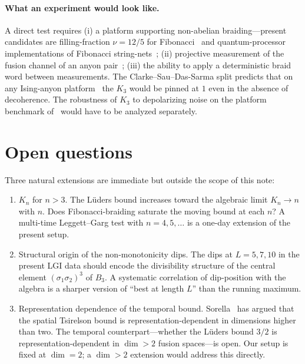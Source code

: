 \documentclass[aps,prx,reprint,amsmath,amssymb,floatfix,nofootinbib,superscriptaddress]{revtex4-2}
\begin{document}
\paragraph{What an experiment would look like.}
A direct test requires (i) a platform supporting non-abelian
braiding---present candidates are filling-fraction $\nu = 12/5$ for
Fibonacci~\cite{NayakSimonStern2008} and quantum-processor
implementations of Fibonacci string-nets~\cite{Xu2024,Minev2025};
(ii) projective measurement of the fusion channel of an anyon
pair~\cite{Bonderson2008}; (iii) the ability to apply a deterministic
braid word between measurements. The Clarke--Sau--Das-Sarma split predicts
that on any Ising-anyon platform~\cite{Andersen2023,Iqbal2024} the
$K_{3}$ would be pinned at $1$ even in the absence of decoherence.
The robustness of $K_{3}$ to depolarizing noise on the platform
benchmark of~\cite{Andersen2023} would have to be analyzed
separately.

\section{Open questions}
\label{sec:open}

Three natural extensions are immediate but outside the scope of this
note:
\begin{enumerate}
\item[\textbf{O1.}] $K_{n}$ for $n > 3$. The L\"uders bound increases
toward the algebraic limit $K_{n} \to n$ with $n$. Does
Fibonacci-braiding saturate the moving bound at each $n$? A
multi-time Leggett--Garg test with $n=4,5,\ldots$ is a one-day
extension of the present setup.
\item[\textbf{O2.}] Structural origin of the non-monotonicity dips.
The dips at $L = 5, 7, 10$ in the present LGI data should encode the
divisibility structure of the central element $(\sigma_{1}\sigma_{2})^{3}$
of $B_{3}$. A systematic correlation of dip-position with the algebra
is a sharper version of ``best at length $L$'' than the running
maximum.
\item[\textbf{O3.}] Representation dependence of the temporal bound.
Sorella~\cite{Sorella2023} has argued that the spatial Tsirelson
bound is representation-dependent in dimensions higher than two. The
temporal counterpart---whether the L\"uders bound $3/2$ is
representation-dependent in $\dim > 2$ fusion spaces---is open. Our
setup is fixed at $\dim = 2$; a $\dim > 2$ extension would address
this directly.
\end{enumerate}
\end{document}
